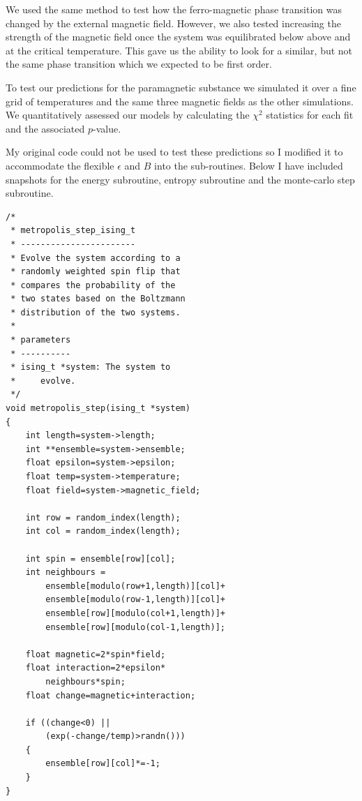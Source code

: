 \documentclass[a4paper, twocolumn]{article}
\begin{document}
We used the same method to test how the ferro-magnetic phase transition %
was changed by the external magnetic field. However, we also tested %
increasing the strength of the magnetic field once the system was %
equilibrated below above and at the critical temperature. This gave %
us the ability to look for a similar, but not the same phase transition %
which we expected to be first order. 


To test our predictions for the paramagnetic substance we simulated it %
over a fine grid of temperatures and the same three magnetic fields as %
the other simulations. We quantitatively assessed our models by calculating %
the \(\chi^{2}\) statistics for each fit and the associated \(p\)-value. %


My original code could not be used to test these predictions so I modified %
it to accommodate the flexible \(\epsilon\) and \(B\) into the sub-routines. %
Below I have included snapshots for the energy subroutine, entropy subroutine %
and the monte-carlo step subroutine. 

\begin{lstlisting}
/*
 * metropolis_step_ising_t
 * -----------------------
 * Evolve the system according to a 
 * randomly weighted spin flip that 
 * compares the probability of the 
 * two states based on the Boltzmann 
 * distribution of the two systems. 
 *
 * parameters
 * ----------
 * ising_t *system: The system to 
 *     evolve. 
 */
void metropolis_step(ising_t *system)
{
    int length=system->length;
    int **ensemble=system->ensemble;
    float epsilon=system->epsilon;
    float temp=system->temperature;
    float field=system->magnetic_field;

    int row = random_index(length);
    int col = random_index(length);

    int spin = ensemble[row][col];
    int neighbours = 
        ensemble[modulo(row+1,length)][col]+
        ensemble[modulo(row-1,length)][col]+
        ensemble[row][modulo(col+1,length)]+
        ensemble[row][modulo(col-1,length)];

    float magnetic=2*spin*field;
    float interaction=2*epsilon*
        neighbours*spin;
    float change=magnetic+interaction;

    if ((change<0) || 
        (exp(-change/temp)>randn()))
    {
        ensemble[row][col]*=-1;
    }
}
\end{lstlisting}
\end{document}
